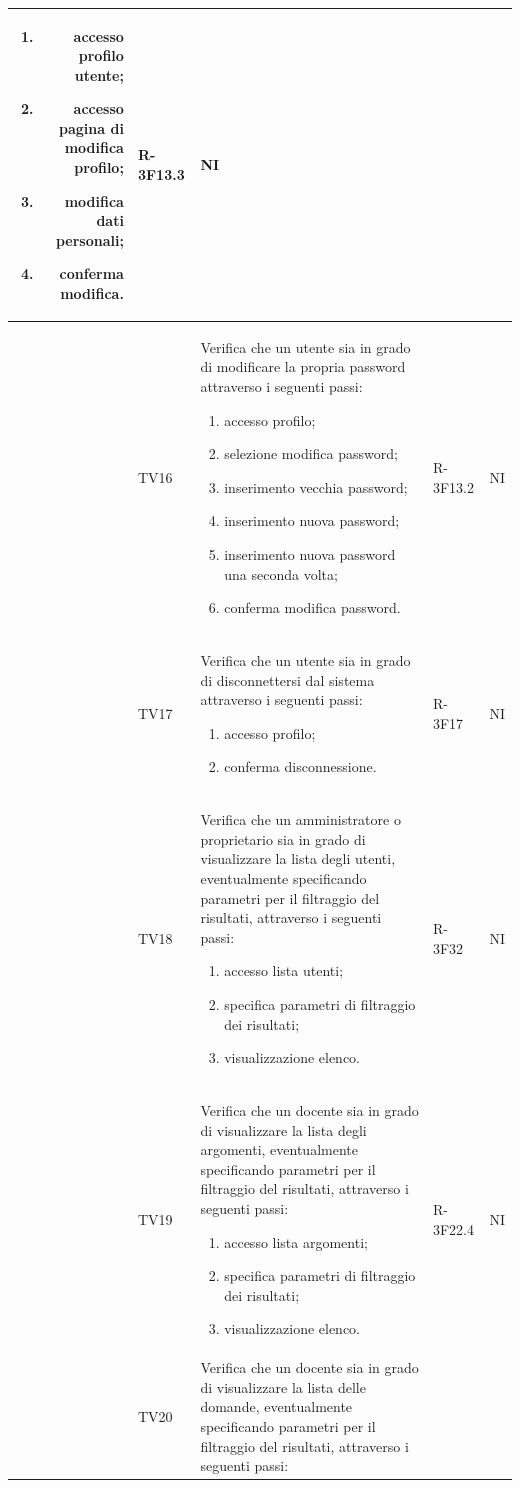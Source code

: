 \documentclass[12pt,a4paper]{article}
\begin{document}
\begin{longtable}{r l p{10cm} l l}
		\begin{enumerate}
			\item accesso profilo utente;
			\item accesso pagina di modifica profilo;
			\item modifica dati personali;
			\item conferma modifica.
		\end{enumerate} & R-3F13.3 & NI\tabularnewline
		\midrule
		& TV16 & Verifica che un utente sia in grado di modificare la propria password attraverso i seguenti passi:
		
		\begin{enumerate}
			\item accesso profilo;
			\item selezione modifica password;
			\item inserimento vecchia password;
			\item inserimento nuova password;
			\item inserimento nuova password una seconda volta;
			\item conferma modifica password.
		\end{enumerate} & R-3F13.2 & NI\tabularnewline
		\midrule
		& TV17 & Verifica che un utente sia in grado di disconnettersi dal sistema attraverso i seguenti passi:
		
		\begin{enumerate}
			\item accesso profilo;
			\item conferma disconnessione.
		\end{enumerate} & R-3F17 & NI\tabularnewline
		\midrule
		& TV18 & Verifica che un amministratore o proprietario sia in grado di visualizzare la lista degli utenti, eventualmente specificando parametri per il filtraggio del risultati, attraverso i seguenti passi:
		
		\begin{enumerate}
			\item accesso lista utenti;
			\item specifica parametri di filtraggio dei risultati;
			\item visualizzazione elenco.
		\end{enumerate} & R-3F32 & NI\tabularnewline
		\midrule
		& TV19 & Verifica che un docente sia in grado di visualizzare la lista degli argomenti, eventualmente specificando parametri per il filtraggio del risultati, attraverso i seguenti passi:
		
		\begin{enumerate}
			\item accesso lista argomenti;
			\item specifica parametri di filtraggio dei risultati;
			\item visualizzazione elenco.
		\end{enumerate} & R-3F22.4 & NI\tabularnewline
		\midrule
		& TV20 & Verifica che un docente sia in grado di visualizzare la lista delle domande, eventualmente specificando parametri per il filtraggio del risultati, attraverso i seguenti passi:
		

\end{longtable}
\end{document}
